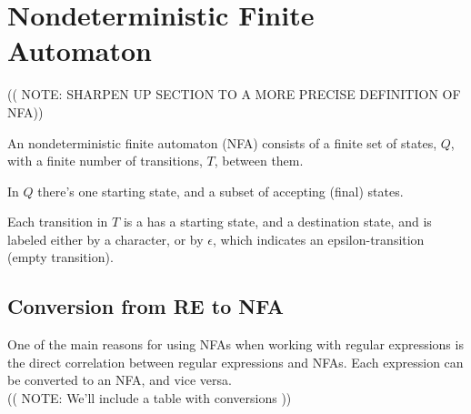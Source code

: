 \section{Nondeterministic Finite Automaton}
(( NOTE: SHARPEN UP SECTION TO A MORE PRECISE DEFINITION OF NFA))

\begin{mydef}
An nondeterministic finite automaton (NFA) consists of a finite set of states, $Q$, with a finite number of transitions, $T$, between them.


In $Q$ there's one starting state, and a subset of accepting (final) states.

Each transition in $T$ is a has a starting state, and a destination state, and is labeled either by a character, or by $\epsilon$, which indicates an epsilon-transition (empty transition).
\end{mydef}

\subsection{Conversion from RE to NFA}
One of the main reasons for using NFAs when working with regular expressions is the direct correlation between regular expressions and NFAs. Each expression can be converted to an NFA, and vice versa.
\\
(( NOTE: We'll include a table with conversions ))
\\

